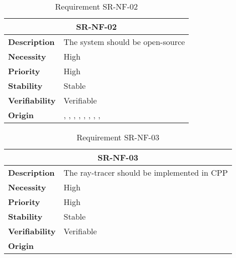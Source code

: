\begin{table}[H]
    \centering
    \begin{tabular}{l p{10cm}}
        \toprule
        \multicolumn{2}{c}{SR-NF-02} \\
        \toprule
        \textbf{Description}        & The system should be open-source \\
        \textbf{Necessity}          &  High \\
        \textbf{Priority}           &  High \\
        \textbf{Stability}          &  Stable \\
        \textbf{Verifiability}      & Verifiable \\
        \textbf{Origin}             &  \textit{\nameref{tab:ur-re-02}}, \textit{\nameref{tab:ur-ca-03}}, \textit{\nameref{tab:ur-ca-05}}, \textit{\nameref{tab:ur-ca-06}}, \textit{\nameref{tab:ur-ca-07}}, \textit{\nameref{tab:ur-ca-08}}, \textit{\nameref{tab:ur-ca-10}}, \textit{\nameref{tab:ur-ca-12}}, \textit{\nameref{tab:ur-ca-13}} \\
    \end{tabular}
    \caption{Requirement SR-NF-02}
    \label{tab:sr-nf-02}
\end{table}

\begin{table}[H]
    \centering
    \begin{tabular}{l p{10cm}}
        \toprule
        \multicolumn{2}{c}{SR-NF-03} \\
        \toprule
        \textbf{Description}        & The ray-tracer should be implemented in \gls{CPP} \\
        \textbf{Necessity}          &  High \\
        \textbf{Priority}           &  High \\
        \textbf{Stability}          &  Stable \\
        \textbf{Verifiability}      & Verifiable \\
        \textbf{Origin}             &  \textit{\nameref{tab:ur-re-01}} \\
    \end{tabular}
    \caption{Requirement SR-NF-03}
    \label{tab:sr-nf-03}
\end{table}

